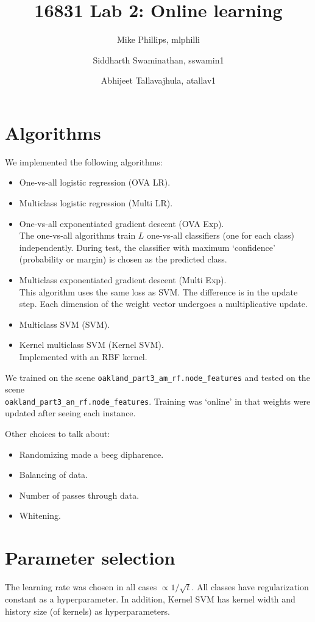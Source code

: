 \documentclass[a4paper]{article}
\title{16831 Lab 2: Online learning}
\author{Mike Phillips, mlphilli \and Siddharth Swaminathan, sswamin1 \and
  Abhijeet Tallavajhula, atallav1}
\begin{document}
\maketitle

\section{Algorithms}
We implemented the following algorithms:
\begin{itemize}
\item One-vs-all logistic regression (OVA LR).
\item Multiclass logistic regression (Multi LR).
\item One-vs-all exponentiated gradient descent (OVA Exp). \\
  The one-vs-all
  algorithms train $L$ one-vs-all classifiers (one for each class)
  independently. During test, the classifier with maximum `confidence'
  (probability or margin) is chosen as the predicted class.
\item Multiclass exponentiated gradient descent (Multi Exp). \\
  This algorithm uses
  the same loss as SVM. The difference is in the update step. Each dimension of
  the weight vector undergoes a multiplicative update. 
\item Multiclass SVM (SVM).
\item Kernel multiclass SVM (Kernel SVM). \\
  Implemented with an RBF kernel.
\end{itemize}

We trained on the scene \texttt{oakland\_part3\_am\_rf.node\_features} and
tested on the scene \\ \texttt{oakland\_part3\_an\_rf.node\_features}. Training
was `online' in that weights were updated after seeing each
instance. 

Other choices to talk about:
\begin{itemize}
\item Randomizing made a beeg dipharence.
\item Balancing of data.
\item Number of passes through data.
\item Whitening.
\end{itemize}

\section{Parameter selection}
The learning rate was chosen in all cases $\propto 1/\sqrt{t}$. All classes have
regularization constant as a hyperparameter. In addition, Kernel SVM has kernel
width and history size (of kernels) as hyperparameters.
\end{document}
